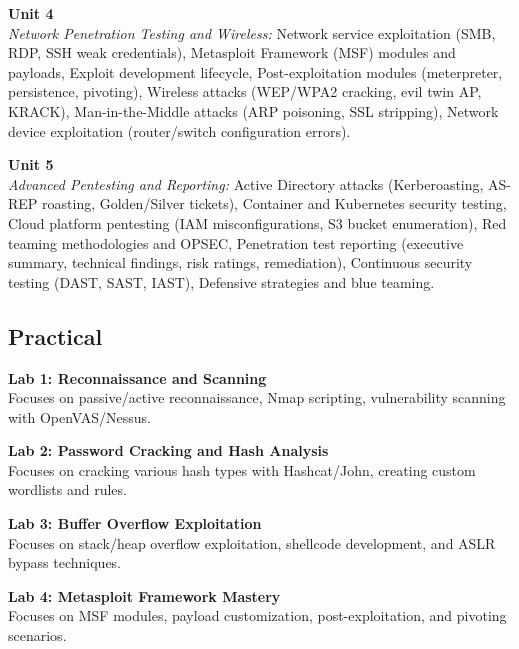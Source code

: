 \noindent\textbf{Unit 4} \\
\textit{Network Penetration Testing and Wireless:} Network service exploitation (SMB, RDP, SSH weak credentials), Metasploit Framework (MSF) modules and payloads, Exploit development lifecycle, Post-exploitation modules (meterpreter, persistence, pivoting), Wireless attacks (WEP/WPA2 cracking, evil twin AP, KRACK), Man-in-the-Middle attacks (ARP poisoning, SSL stripping), Network device exploitation (router/switch configuration errors).

\vspace{0.3cm}

\noindent\textbf{Unit 5} \\
\textit{Advanced Pentesting and Reporting:} Active Directory attacks (Kerberoasting, AS-REP roasting, Golden/Silver tickets), Container and Kubernetes security testing, Cloud platform pentesting (IAM misconfigurations, S3 bucket enumeration), Red teaming methodologies and OPSEC, Penetration test reporting (executive summary, technical findings, risk ratings, remediation), Continuous security testing (DAST, SAST, IAST), Defensive strategies and blue teaming.

\newpage

\subsection*{Practical}
\noindent\textbf{Lab 1: Reconnaissance and Scanning} \\
Focuses on passive/active reconnaissance, Nmap scripting, vulnerability scanning with OpenVAS/Nessus.

\vspace{0.2cm}

\noindent\textbf{Lab 2: Password Cracking and Hash Analysis} \\
Focuses on cracking various hash types with Hashcat/John, creating custom wordlists and rules.

\vspace{0.2cm}

\noindent\textbf{Lab 3: Buffer Overflow Exploitation} \\
Focuses on stack/heap overflow exploitation, shellcode development, and ASLR bypass techniques.

\vspace{0.2cm}

\noindent\textbf{Lab 4: Metasploit Framework Mastery} \\
Focuses on MSF modules, payload customization, post-exploitation, and pivoting scenarios.

